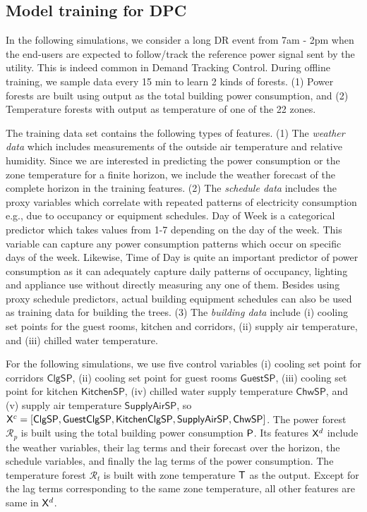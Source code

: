 \subsection{Model training for DPC}

In the following simulations, we consider a long DR event from 7am - 2pm when the end-users are expected to follow/track the reference power signal sent by the utility. This is indeed common in Demand Tracking Control. 
During offline training, we sample data every 15 min to learn 2 kinds of forests. (1) Power forests are built using output as the total building power consumption, and (2) Temperature forests with output as temperature of one of the 22 zones. 

The training data set contains the following types of features. (1) The \textit{weather data} which includes measurements of the outside air temperature and relative humidity. Since we are interested in predicting the power consumption or the zone temperature for a finite horizon, we include the weather forecast of the complete horizon in the training features. (2) The \textit{schedule data} includes the proxy variables which correlate with repeated patterns of electricity consumption e.g., due to occupancy or equipment schedules. Day of Week is a categorical predictor which takes values from 1-7 depending on the day of the week. This variable can capture any power consumption patterns which occur on specific days of the week. Likewise, Time of Day is quite an important predictor of power consumption as it can adequately capture daily patterns of occupancy, lighting and appliance use without directly measuring any one of them. Besides using proxy schedule predictors, actual building equipment schedules can also be used as training data for building the trees. (3) The \textit{building data} include (i) cooling set points for  the guest rooms, kitchen and corridors, (ii) supply air temperature, and (iii) chilled water temperature.

For the following simulations, we use five control variables (i) cooling set point for corridors $\mathsf{ClgSP}$, (ii) cooling set point for guest rooms $\mathsf{GuestSP}$, (iii) cooling set point for kitchen $\mathsf{KitchenSP}$, (iv) chilled water supply temperature $\mathsf{ChwSP}$, and (v) supply air temperature  $\mathsf{SupplyAirSP}$, so $\mathsf{X}^c = [\mathsf{ClgSP},\mathsf{GuestClgSP},\mathsf{KitchenClgSP},\mathsf{SupplyAirSP}, \mathsf{ChwSP}]$. 
The power forest $\mathcal{R}_p$ is built using the total building power consumption $\mathsf{P}$. Its features $\mathsf{X}^d$ include the weather variables, their lag terms and their forecast over the horizon, the schedule variables, and finally the lag terms of the power consumption.
The temperature forest $\mathcal{R}_t$ is built with zone temperature $\mathsf{T}$ as the output. Except for the lag terms corresponding to the same zone temperature, all other features are same in $\mathsf{X}^d$.

